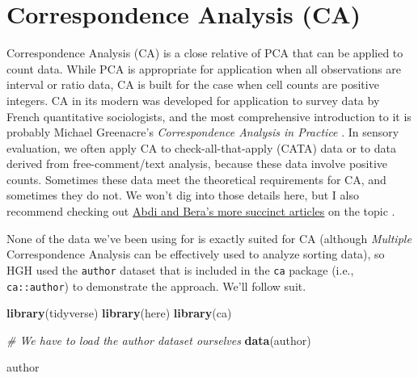 \documentclass[
]{book}
\newenvironment{Shaded}{\begin{snugshade}}{\end{snugshade}}
\newcommand{\CommentTok}[1]{\textcolor[rgb]{0.56,0.35,0.01}{\textit{#1}}}
\newcommand{\FunctionTok}[1]{\textcolor[rgb]{0.13,0.29,0.53}{\textbf{#1}}}
\newcommand{\NormalTok}[1]{#1}
\begin{document}
\chapter{Correspondence Analysis (CA)}\label{correspondence-analysis-ca}

Correspondence Analysis (CA) is a close relative of PCA that can be applied to count data. While PCA is appropriate for application when all observations are interval or ratio data, CA is built for the case when cell counts are positive integers. CA in its modern was developed for application to survey data by French quantitative sociologists, and the most comprehensive introduction to it is probably Michael Greenacre's \emph{Correspondence Analysis in Practice} \citep{greenacre2017correspondence}. In sensory evaluation, we often apply CA to check-all-that-apply (CATA) data or to data derived from free-comment/text analysis, because these data involve positive counts. Sometimes these data meet the theoretical requirements for CA, and sometimes they do not. We won't dig into those details here, but I also recommend checking out \href{https://personal.utdallas.edu/~herve/abdi-AB2014_CA.pdf}{Abdi and Bera's more succinct articles} on the topic \citep{abdiCorrespondence}.

None of the data we've been using for is exactly suited for CA (although \emph{Multiple} Correspondence Analysis can be effectively used to analyze sorting data), so HGH used the \texttt{author} dataset that is included in the \texttt{ca} package (i.e., \texttt{ca::author}) to demonstrate the approach. We'll follow suit.

\begin{Shaded}
\begin{Highlighting}[]
\FunctionTok{library}\NormalTok{(tidyverse)}
\FunctionTok{library}\NormalTok{(here)}
\FunctionTok{library}\NormalTok{(ca)}

\CommentTok{\# We have to load the \textasciigrave{}author\textasciigrave{} dataset ourselves}
\FunctionTok{data}\NormalTok{(author)}

\NormalTok{author}
\end{Highlighting}
\end{Shaded}
\end{document}
